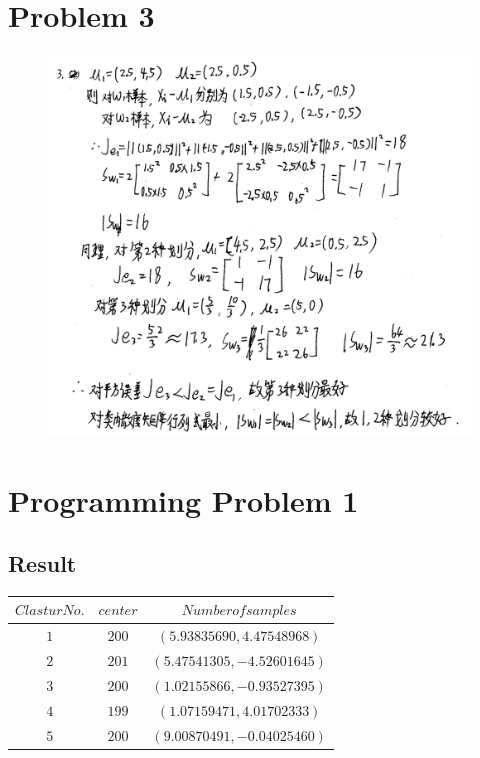 \documentclass[]{article}
\begin{document}
    \section{Problem 3}
    \begin{figure}[H]
        \centering
        \includegraphics[scale=1.0]{P3.png}
    \end{figure}
    \section{Programming Problem 1}
    \subsection{Result}
    \begin{table}[h!]
            \centering            
            \begin{tabular}{c|*{2}{c}}
            \hline
$Clastur No.$ & $center$ & $Number of samples$  \\
\hline
$1$ & $200$ & $(5.93835690,  4.47548968)$  \\
$2$ & $201$ & $(5.47541305, -4.52601645)$  \\
$3$ & $200$ & $(1.02155866, -0.93527395)$  \\
$4$ & $199$ & $(1.07159471,  4.01702333)$  \\
$5$ & $200$ & $(9.00870491, -0.04025460)$  \\
            \hline            
            \end{tabular}
\end{table}
\end{document}
